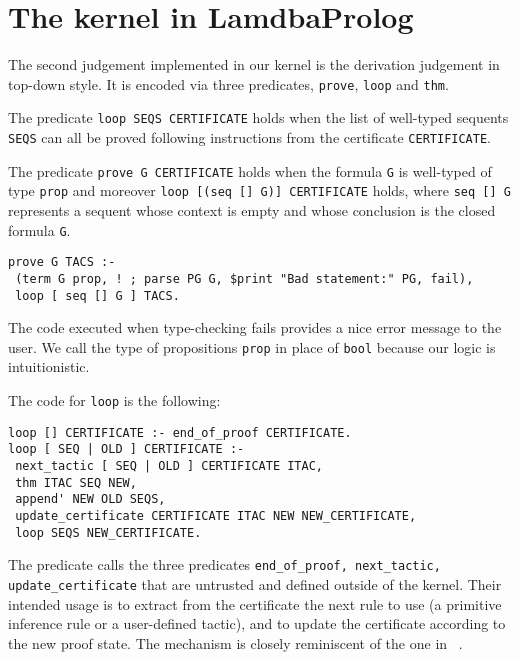\documentclass[preprint]{sigplanconf}
\begin{document}
% 
% 

\section{The kernel in LamdbaProlog}
The second judgement implemented in our kernel is the derivation judgement in top-down style. It is encoded via three predicates, \verb+prove+, \verb+loop+ and \verb+thm+.

The predicate \verb+loop SEQS CERTIFICATE+ holds when the list of well-typed sequents \verb+SEQS+ can all be proved following instructions from the certificate \verb+CERTIFICATE+.

The predicate \verb+prove G CERTIFICATE+ holds when the formula \verb+G+ is well-typed of type \verb+prop+ and moreover \verb+loop [(seq [] G)] CERTIFICATE+ holds, where \verb+seq [] G+ represents a sequent whose context is empty and whose conclusion is the closed formula \verb+G+.
\begin{small}
\begin{verbatim}
prove G TACS :-
 (term G prop, ! ; parse PG G, $print "Bad statement:" PG, fail),
 loop [ seq [] G ] TACS.
\end{verbatim}
\end{small}
The code executed when type-checking fails provides a nice error message to the user. We call the type of propositions \verb+prop+ in place of \verb+bool+ because our logic is intuitionistic.

The code for \verb+loop+ is the following:
\begin{small}
\begin{verbatim}
loop [] CERTIFICATE :- end_of_proof CERTIFICATE.
loop [ SEQ | OLD ] CERTIFICATE :-
 next_tactic [ SEQ | OLD ] CERTIFICATE ITAC,
 thm ITAC SEQ NEW,
 append' NEW OLD SEQS,
 update_certificate CERTIFICATE ITAC NEW NEW_CERTIFICATE,
 loop SEQS NEW_CERTIFICATE.
\end{verbatim}
\end{small}
The predicate calls the three predicates \verb+end_of_proof, next_tactic, update_certificate+ that are untrusted and defined outside of the kernel. Their intended usage is to extract from the certificate the next rule to use (a primitive inference rule or a user-defined tactic), and to update the certificate according to the new proof state. The mechanism is closely reminiscent of the one in ~\cite{zak2}.
\end{document}
